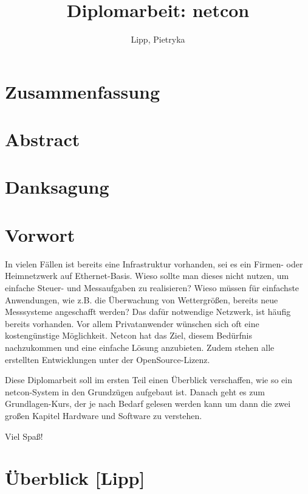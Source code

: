 \documentclass[a4paper,14pt,headsepline]{scrartcl}
\begin{document}
\author{Lipp, Pietryka} 
\title{Diplomarbeit: netcon} 
\date{} 
\maketitle

\newpage

\section*{Zusammenfassung}
\newpage

\section*{Abstract}
\newpage

\section*{Danksagung}
\newpage

\section*{Vorwort}
In vielen Fällen ist bereits eine Infrastruktur vorhanden, sei es ein Firmen- oder Heimnetzwerk auf Ethernet-Basis. Wieso sollte man dieses nicht nutzen, um einfache Steuer- und Messaufgaben zu realisieren? Wieso müssen für einfachste Anwendungen, wie z.B. die Überwachung von Wettergrößen, bereits neue Messsysteme angeschafft werden? Das dafür notwendige Netzwerk, ist häufig bereits vorhanden. Vor allem Privatanwender wünschen sich oft eine kostengünstige Möglichkeit. Netcon hat das Ziel, diesem Bedürfnis nachzukommen und eine einfache Lösung anzubieten. Zudem stehen alle erstellten Entwicklungen unter der OpenSource-Lizenz. 

Diese Diplomarbeit soll im ersten Teil einen Überblick verschaffen, wie so ein netcon-System in den Grundzügen aufgebaut ist. Danach geht es zum \linebreak Grundlagen-Kurs, der je nach Bedarf gelesen werden kann um dann die zwei großen Kapitel Hardware und Software zu verstehen.

Viel Spaß!

\newpage

\tableofcontents
\newpage


\section{Überblick [Lipp]}
\end{document}
